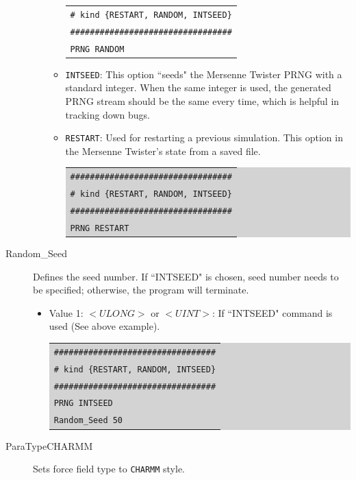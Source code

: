 \begin{description}
\begin{itemize}
\begin{itemize}
{\begin{tabular}{l}
		\texttt{\# kind \{RESTART, RANDOM, INTSEED\}}\\
		\texttt{\#\#\#\#\#\#\#\#\#\#\#\#\#\#\#\#\#\#\#\#\#\#\#\#\#\#\#\#\#\#\#\#\#}\\
		\texttt{PRNG RANDOM}\\
		\end{tabular}}
		\item \texttt{INTSEED}: This option ``seeds" the Mersenne Twister PRNG with a standard integer. When the same integer is used, the generated PRNG stream should be the same every time, which is helpful in tracking down bugs.
		\item \texttt{RESTART}: Used for restarting a previous simulation. This option in the Mersenne Twister's state from a saved file.\\
		\colorbox{lightgray}{
		\begin{tabular}{l}
		\texttt{\#\#\#\#\#\#\#\#\#\#\#\#\#\#\#\#\#\#\#\#\#\#\#\#\#\#\#\#\#\#\#\#\#}\\
		\texttt{\# kind \{RESTART, RANDOM, INTSEED\}}\\
		\texttt{\#\#\#\#\#\#\#\#\#\#\#\#\#\#\#\#\#\#\#\#\#\#\#\#\#\#\#\#\#\#\#\#\#}\\
		\texttt{PRNG RESTART}\\
		\end{tabular}}
		\end{itemize}
	\end{itemize}
\item [Random\_Seed] Defines the seed number. If ``INTSEED" is chosen, seed number needs to be specified; otherwise, the program will terminate.
	\begin{itemize}
	\item Value 1: $<ULONG>$ or $<UINT>$: If ``INTSEED" command is used (See above example).\\
	\colorbox{lightgray}{
	\begin{tabular}{l}
	\texttt{\#\#\#\#\#\#\#\#\#\#\#\#\#\#\#\#\#\#\#\#\#\#\#\#\#\#\#\#\#\#\#\#\#}\\
	\texttt{\# kind \{RESTART, RANDOM, INTSEED\}}\\
	\texttt{\#\#\#\#\#\#\#\#\#\#\#\#\#\#\#\#\#\#\#\#\#\#\#\#\#\#\#\#\#\#\#\#\#}\\
	\texttt{PRNG INTSEED}\\
	\texttt{Random\_Seed 50}\\
	\end{tabular}}
	\end{itemize}
\item [ParaTypeCHARMM] Sets force field type to \texttt{CHARMM} style.

\end{description}
